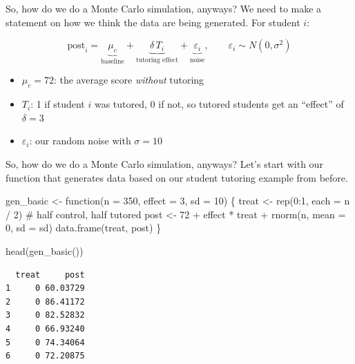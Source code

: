 \documentclass[
  ignorenonframetext,
  aspectratio=169,
]{beamer}
\newenvironment{Shaded}{\begin{snugshade}}{\end{snugshade}}
\newcommand{\AttributeTok}[1]{\textcolor[rgb]{0.40,0.45,0.13}{#1}}
\newcommand{\CommentTok}[1]{\textcolor[rgb]{0.37,0.37,0.37}{#1}}
\newcommand{\ControlFlowTok}[1]{\textcolor[rgb]{0.00,0.23,0.31}{#1}}
\newcommand{\DecValTok}[1]{\textcolor[rgb]{0.68,0.00,0.00}{#1}}
\newcommand{\FunctionTok}[1]{\textcolor[rgb]{0.28,0.35,0.67}{#1}}
\newcommand{\NormalTok}[1]{\textcolor[rgb]{0.00,0.23,0.31}{#1}}
\newcommand{\OtherTok}[1]{\textcolor[rgb]{0.00,0.23,0.31}{#1}}
\newcommand{\SpecialCharTok}[1]{\textcolor[rgb]{0.37,0.37,0.37}{#1}}
\providecommand{\tightlist}{%
  \setlength{\itemsep}{0pt}\setlength{\parskip}{0pt}}\usepackage{longtable,booktabs,array}
\begin{document}
\begin{frame}{So, how do we do a Monte Carlo simulation, anyways?}
\label{so-how-do-we-do-a-monte-carlo-simulation-anyways-2}
We need to make a statement on how we think the data are being
generated. For student \(i\):

\[
\text{post}_i = \underbrace{\mu_c}_{\text{baseline}} + \underbrace{\delta \, T_i}_{\text{tutoring effect}} + \underbrace{\varepsilon_i}_{\text{noise}}, \qquad \varepsilon_i \sim N(0, \sigma^2)
\]

\vskip10pt

\begin{itemize}
\tightlist
\item
  \(\mu_c = 72\): the average score \emph{without} tutoring
\item
  \(T_i\): 1 if student \(i\) was tutored, 0 if not, so tutored students
  get an ``effect'' of \(\delta = 3\)
\item
  \(\varepsilon_i\): our random noise with \(\sigma = 10\)
\end{itemize}

\vskip10pt
\end{frame}

\begin{frame}[fragile]{So, how do we do a Monte Carlo simulation,
anyways?}
\label{so-how-do-we-do-a-monte-carlo-simulation-anyways-3}
Let's start with our function that generates data based on our student
tutoring example from before.

\begin{Shaded}
\begin{Highlighting}[]
\NormalTok{gen\_basic }\OtherTok{\textless{}{-}} \ControlFlowTok{function}\NormalTok{(}\AttributeTok{n =} \DecValTok{350}\NormalTok{, }\AttributeTok{effect =} \DecValTok{3}\NormalTok{, }\AttributeTok{sd =} \DecValTok{10}\NormalTok{) \{}
\NormalTok{    treat }\OtherTok{\textless{}{-}} \FunctionTok{rep}\NormalTok{(}\DecValTok{0}\SpecialCharTok{:}\DecValTok{1}\NormalTok{, }\AttributeTok{each =}\NormalTok{ n }\SpecialCharTok{/} \DecValTok{2}\NormalTok{) }\CommentTok{\# half control, half tutored}
\NormalTok{    post }\OtherTok{\textless{}{-}} \DecValTok{72} \SpecialCharTok{+}\NormalTok{ effect }\SpecialCharTok{*}\NormalTok{ treat }\SpecialCharTok{+} \FunctionTok{rnorm}\NormalTok{(n, }\AttributeTok{mean =} \DecValTok{0}\NormalTok{, }\AttributeTok{sd =}\NormalTok{ sd)}
    \FunctionTok{data.frame}\NormalTok{(treat, post)}
\NormalTok{\}}

\FunctionTok{head}\NormalTok{(}\FunctionTok{gen\_basic}\NormalTok{())}
\end{Highlighting}
\end{Shaded}

\begin{verbatim}
  treat     post
1     0 60.03729
2     0 86.41172
3     0 82.52832
4     0 66.93240
5     0 74.34064
6     0 72.20875
\end{verbatim}
\end{frame}
\end{document}

